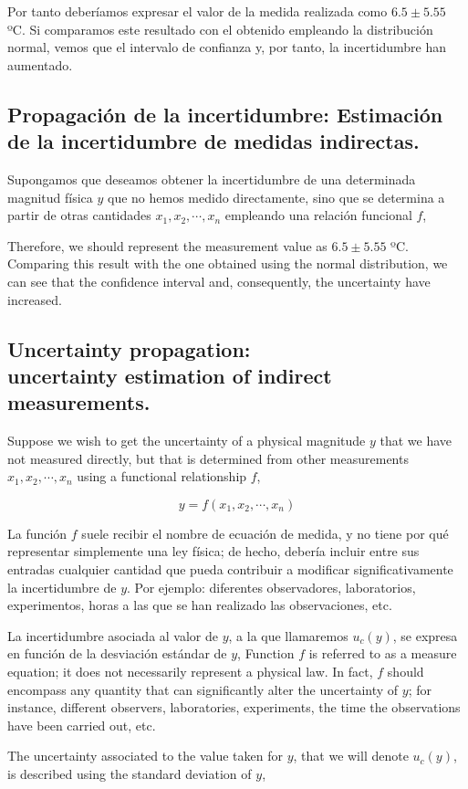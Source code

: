 \begin{paracol}{2}
Por tanto deberíamos expresar el valor de la medida realizada como $6.5\pm 5.55$ ºC. Si comparamos este resultado con el obtenido empleando la distribución normal, vemos que el intervalo de confianza y, por tanto, la incertidumbre han aumentado.

\subsection{Propagación de la incertidumbre: Estimación de la incertidumbre de medidas indirectas.}

Supongamos que deseamos obtener la incertidumbre de una determinada magnitud física $y$ que no hemos medido directamente, sino que se determina a partir de otras cantidades $x_1,x_2,\cdots,x_n$ empleando una relación funcional $f$,

\switchcolumn
Therefore, we should represent the measurement value as $6.5 \pm 5.55$ ºC. Comparing this result with the one obtained using the normal distribution, we can see that the confidence interval and, consequently, the uncertainty have increased.

\subsection{Uncertainty propagation:\\ uncertainty estimation of indirect measurements.}

Suppose we wish to get the uncertainty of a physical magnitude $y$ that we have not measured directly, but that is determined from other measurements $x_1,x_2,\cdots,x_n$ using a functional relationship $f$,  
\end{paracol}

\begin{equation*}
y = f(x_1,x_2,\cdots,x_n)
\end{equation*}

\begin{paracol}{2}
La función $f$ suele recibir el nombre de ecuación de medida, y no tiene por qué representar simplemente una ley física; de hecho, debería incluir entre sus entradas cualquier cantidad que pueda contribuir a modificar significativamente la incertidumbre de $y$. Por ejemplo: diferentes observadores, laboratorios, experimentos, horas a las que se han realizado las observaciones, etc.

La incertidumbre asociada al valor de $y$, a la que llamaremos $u_c(y)$, se expresa en función de la desviación estándar de $y$,  
\switchcolumn
Function $f$ is referred to as a measure equation; it does not necessarily represent a physical law. In fact, $f$ should encompass any quantity that can significantly alter the uncertainty of $y$; for instance, different observers, laboratories, experiments, the time the observations have been carried out, etc.   

The uncertainty associated to the value taken for $y$, that we will denote $u_c(y)$, is described using the standard deviation of $y$,
\end{paracol}

